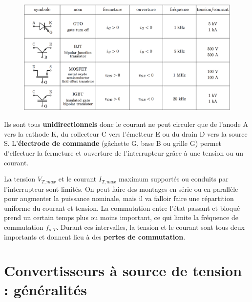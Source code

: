 	\begin{figure}
	\vspace{-5mm}
	\includegraphics[scale=0.2]{ch4/5}
	\end{figure}
	Ils sont tous \textbf{unidirectionnels} donc le courant ne peut circuler que de l'anode A vers la cathode K, du collecteur C vers l'émetteur E ou du drain D vers la source S. L'\textbf{électrode de commande} (gâchette G, base B ou grille G) permet d'effectuer la fermeture et ouverture de l'interrupteur grâce à une tension ou un courant. 
	
	La tension $V_{T,max}$ et le courant $I_{T,max}$ maximum supportés ou conduits par l'interrupteur sont limités. On peut faire des montages en série ou en parallèle pour augmenter la puissance nominale, mais il va falloir faire une répartition uniforme du courant et tension. La commutation entre l'état passant et bloqué prend un certain temps plus ou moins important, ce qui limite la fréquence de commutation $f_{s,T}$. Durant ces intervalles, la tension et le courant sont tous deux importants et donnent lieu à des \textbf{pertes de commutation}.
	
\section{Convertisseurs à source de tension : généralités}
